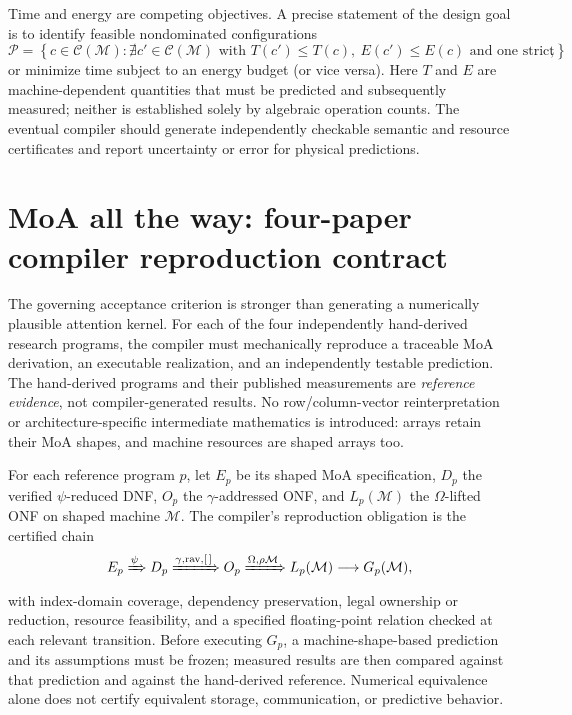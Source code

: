 \documentclass[11pt]{article}
\begin{document}
Time and energy are competing objectives. A precise statement of the design goal is to identify feasible nondominated configurations
\begin{equation}
\mathcal{P}=\left\{c\in\mathcal{C}(\mathcal{M}):\nexists c'\in\mathcal{C}(\mathcal{M})\text{ with }T(c')\le T(c),\ E(c')\le E(c)\text{ and one strict}\right\},
\end{equation}
or minimize time subject to an energy budget (or vice versa). Here $T$ and $E$ are machine-dependent quantities that must be predicted and subsequently measured; neither is established solely by algebraic operation counts. The eventual compiler should generate independently checkable semantic and resource certificates and report uncertainty or error for physical predictions.

\section{MoA all the way: four-paper compiler reproduction contract}
\label{sec:fourpapercontract}
The governing acceptance criterion is stronger than generating a numerically plausible attention kernel. For each of the four independently hand-derived research programs, the compiler must mechanically reproduce a traceable MoA derivation, an executable realization, and an independently testable prediction. The hand-derived programs and their published measurements are \emph{reference evidence}, not compiler-generated results. No row/column-vector reinterpretation or architecture-specific intermediate mathematics is introduced: arrays retain their MoA shapes, and machine resources are shaped arrays too.

For each reference program $p$, let $E_p$ be its shaped MoA specification, $D_p$ the verified $\psi$-reduced DNF, $O_p$ the $\gamma$-addressed ONF, and $L_p(\mathcal M)$ the $\Omega$-lifted ONF on shaped machine $\mathcal M$. The compiler's reproduction obligation is the certified chain
\[
E_p \xRightarrow{\psi} D_p
\xRightarrow{\gamma,\operatorname{rav},[\,]} O_p
\xRightarrow{\Omega,\rho\mathcal M} L_p(\mathcal M)
\longrightarrow G_p(\mathcal M),
\]
with index-domain coverage, dependency preservation, legal ownership or reduction, resource feasibility, and a specified floating-point relation checked at each relevant transition. Before executing $G_p$, a machine-shape-based prediction and its assumptions must be frozen; measured results are then compared against that prediction and against the hand-derived reference. Numerical equivalence alone does not certify equivalent storage, communication, or predictive behavior.
\end{document}

